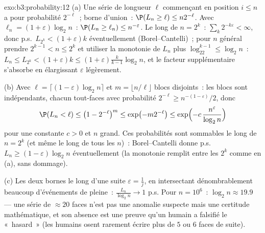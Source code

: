 \begin{solution}{exo:b3:probability:12}
(a) Une série de longueur $\ell$ commençant en position $i
\leq n$ a pour probabilité $2^{-\ell}$~; borne d'union~:
$\P(L_n \geq \ell) \leq n2^{-\ell}$. Avec $\ell_n = (1 +
\varepsilon)\log_2n$~: $\P(L_n \geq \ell_n) \leq
n^{-\varepsilon}$. Le long de $n = 2^k$~:
$\sum_k2^{-k\varepsilon} < \infty$, donc p.s.\ $L_{2^k} <
(1+\varepsilon)k$ éventuellement (Borel--Cantelli)~; pour
$n$ général prendre $2^{k-1} < n \leq 2^k$ et utiliser la
monotonie de $L_n$ plus $\log_22^{k-1} \leq \log_2n$~:
$L_n \leq L_{2^k} < (1 + \varepsilon)k \leq (1 +
\varepsilon)\frac{k}{k-1}\log_2n$, et le facteur
supplémentaire s'absorbe en élargissant $\varepsilon$
légèrement.

(b) Avec $\ell = \lceil(1 - \varepsilon)\log_2n\rceil$ et
$m = \lfloor n/\ell\rfloor$ blocs disjoints~: les blocs
sont indépendants, chacun tout-faces avec probabilité
$2^{-\ell} \geq n^{-(1-\varepsilon)}/2$, donc
\[
\P(L_n < \ell) \leq \bigl(1 - 2^{-\ell}\bigr)^{m}
\leq \exp\bigl(-m2^{-\ell}\bigr)
\leq \exp\Bigl(-c\,\frac{n^{\varepsilon}}{\log_2n}\Bigr)
\]
pour une constante $c > 0$ et $n$ grand. Ces probabilités
sont sommables le long de $n = 2^k$ (et même le long de
tous les $n$)~: Borel--Cantelli donne p.s.\ $L_n \geq (1 -
\varepsilon)\log_2n$ éventuellement (la monotonie remplit
entre les $2^k$ comme en (a), sans dommage).

(c) Les deux bornes le long d'une suite $\varepsilon =
\frac1j$, en intersectant dénombrablement beaucoup
d'événements de  pleine~: $\frac{L_n}{\log_2n} \to 1$
p.s. Pour $n = 10^6$~: $\log_2n \approx 19.9$ --- une
série de $\approx 20$ faces n'est pas une anomalie
suspecte mais une certitude mathématique, et son absence
est une preuve qu'un humain a falsifié le «~hasard~» (les
humains osent rarement écrire plus de $5$ ou $6$ faces de
suite).
\end{solution}

